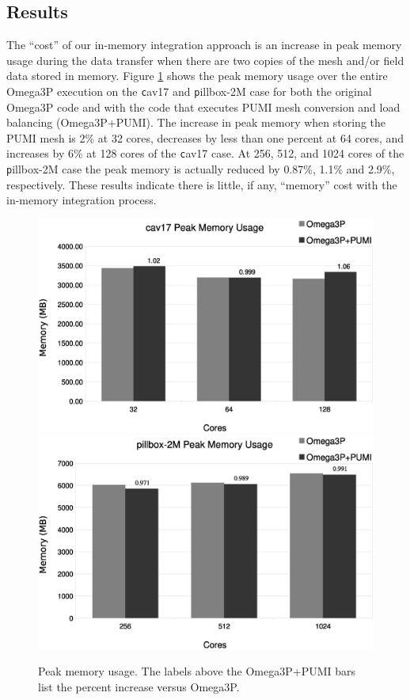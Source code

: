\documentclass[review,12pt]{elsarticle_summary_report}
\begin{document}
\subsection{\label{in_memory_results} Results}
The ``cost'' of our in-memory integration approach is an increase in peak memory
usage during the data transfer when there are two copies of the mesh and/or
field data stored in memory.
Figure \ref{fig:memusage} shows the peak memory usage over the entire Omega3P
execution on the {\texttt cav17} and {\texttt pillbox-2M} case for both the
original Omega3P code and with the code that executes PUMI mesh conversion and
load balancing (Omega3P+PUMI).
The increase in peak memory when storing the PUMI mesh is 2\% at 32 cores,
decreases by less than one percent at 64 cores, and increases by 6\% at 128
cores of the {\texttt cav17} case.
At 256, 512, and 1024 cores of the {\texttt pillbox-2M} case the peak memory is actually reduced by
0.87\%, 1.1\% and 2.9\%, respectively. These results indicate there is little, if any, ``memory'' cost with the in-memory integration process.

\begin{figure}[!ph]
\centering
  \includegraphics[width=.75\textwidth]{cav17-peak-mem.eps}
  \includegraphics[width=.75\textwidth]{pillbox2M-peak-mem.eps}
  \caption{\label{fig:memusage} Peak memory usage. The labels above the Omega3P+PUMI bars
  list the percent increase versus Omega3P.}
\end{figure}
\end{document}
